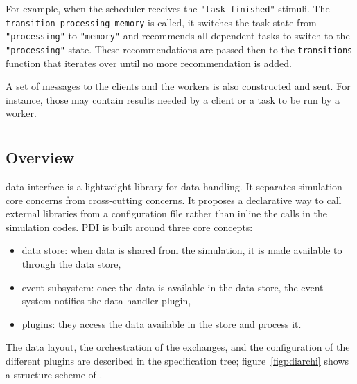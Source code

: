 For example, when the scheduler receives the \texttt{"task-finished"} stimuli. The \texttt{transition\_processing\_memory} is called, it switches the task state from \texttt{"processing"} to \texttt{"memory"} and recommends all dependent tasks to switch to the \texttt{"processing"} state. These recommendations are passed then to the \texttt{transitions} function that iterates over until no more recommendation is added.

A set of messages to the clients and the workers is also constructed and sent. For instance, those may contain results needed by a client or a task to be run by a worker.


\section{\pdi}\label{sec:pdi}
\subsection{Overview}\label{sec:pdioverview}

\pdi\cite{roussel:hal-01587075} data interface is a lightweight library for data handling. It separates simulation core concerns from cross-cutting concerns. It proposes a declarative way to call external libraries from a configuration file rather than inline the calls in the simulation codes. 
PDI is built around three core concepts: 
\begin{itemize}
    \item data store: when data is shared from the simulation, it is made available to \pdi through the data store,
    \item event subsystem: once the data is available in the data store, the event system notifies the data handler plugin,
    \item plugins: they access the data available in the store and process it.   
\end{itemize}
The data layout, the orchestration of the exchanges, and the configuration of the different plugins are described in the specification tree; figure~\ref {figpdiarchi} shows a structure scheme of \pdi\cite{noauthor_pdi_nodate}.  


